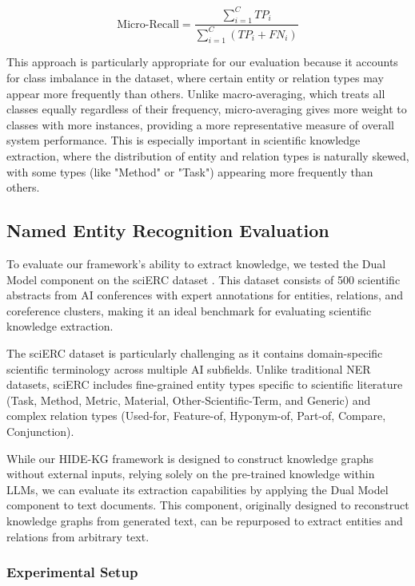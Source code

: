 \documentclass[11pt]{article}
\begin{document}
\begin{equation}
    \text{Micro-Recall} = \frac{\sum_{i=1}^{C} TP_i}{\sum_{i=1}^{C} (TP_i + FN_i)}
\end{equation}

This approach is particularly appropriate for our evaluation because it accounts for class imbalance in the dataset, where certain entity or relation types may appear more frequently than others. Unlike macro-averaging, which treats all classes equally regardless of their frequency, micro-averaging gives more weight to classes with more instances, providing a more representative measure of overall system performance. This is especially important in scientific knowledge extraction, where the distribution of entity and relation types is naturally skewed, with some types (like "Method" or "Task") appearing more frequently than others.

\subsection{Named Entity Recognition Evaluation}

To evaluate our framework's ability to extract knowledge, we tested the Dual Model component on the sciERC dataset \cite{luan2018multi}. This dataset consists of 500 scientific abstracts from AI conferences with expert annotations for entities, relations, and coreference clusters, making it an ideal benchmark for evaluating scientific knowledge extraction.

The sciERC dataset is particularly challenging as it contains domain-specific scientific terminology across multiple AI subfields. Unlike traditional NER datasets, sciERC includes fine-grained entity types specific to scientific literature (Task, Method, Metric, Material, Other-Scientific-Term, and Generic) and complex relation types (Used-for, Feature-of, Hyponym-of, Part-of, Compare, Conjunction).

While our HIDE-KG framework is designed to construct knowledge graphs without external inputs, relying solely on the pre-trained knowledge within LLMs, we can evaluate its extraction capabilities by applying the Dual Model component to text documents. This component, originally designed to reconstruct knowledge graphs from generated text, can be repurposed to extract entities and relations from arbitrary text.

\subsubsection{Experimental Setup}
\end{document}
